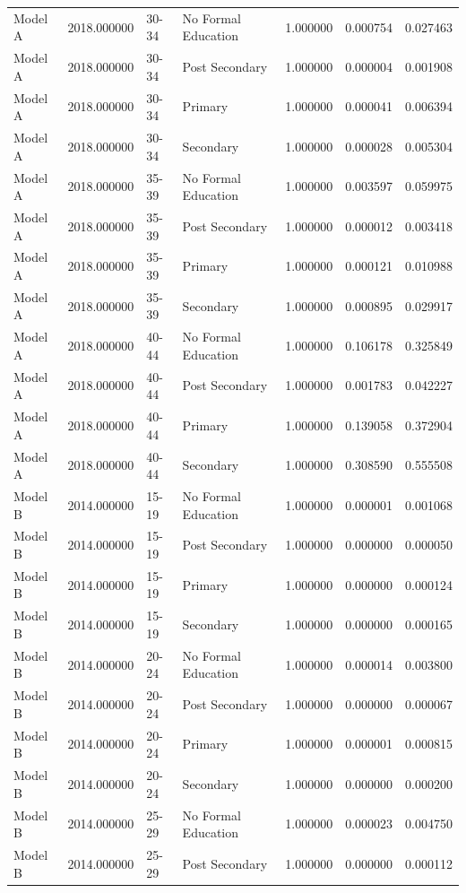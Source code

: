 \begin{table}[ht]
\begin{tabular}{lrllrrr}
Model A & 2018.000000 & 30-34 & No Formal Education & 1.000000 & 0.000754 & 0.027463 \\
Model A & 2018.000000 & 30-34 & Post Secondary & 1.000000 & 0.000004 & 0.001908 \\
Model A & 2018.000000 & 30-34 & Primary & 1.000000 & 0.000041 & 0.006394 \\
Model A & 2018.000000 & 30-34 & Secondary & 1.000000 & 0.000028 & 0.005304 \\
Model A & 2018.000000 & 35-39 & No Formal Education & 1.000000 & 0.003597 & 0.059975 \\
Model A & 2018.000000 & 35-39 & Post Secondary & 1.000000 & 0.000012 & 0.003418 \\
Model A & 2018.000000 & 35-39 & Primary & 1.000000 & 0.000121 & 0.010988 \\
Model A & 2018.000000 & 35-39 & Secondary & 1.000000 & 0.000895 & 0.029917 \\
Model A & 2018.000000 & 40-44 & No Formal Education & 1.000000 & 0.106178 & 0.325849 \\
Model A & 2018.000000 & 40-44 & Post Secondary & 1.000000 & 0.001783 & 0.042227 \\
Model A & 2018.000000 & 40-44 & Primary & 1.000000 & 0.139058 & 0.372904 \\
Model A & 2018.000000 & 40-44 & Secondary & 1.000000 & 0.308590 & 0.555508 \\
Model B & 2014.000000 & 15-19 & No Formal Education & 1.000000 & 0.000001 & 0.001068 \\
Model B & 2014.000000 & 15-19 & Post Secondary & 1.000000 & 0.000000 & 0.000050 \\
Model B & 2014.000000 & 15-19 & Primary & 1.000000 & 0.000000 & 0.000124 \\
Model B & 2014.000000 & 15-19 & Secondary & 1.000000 & 0.000000 & 0.000165 \\
Model B & 2014.000000 & 20-24 & No Formal Education & 1.000000 & 0.000014 & 0.003800 \\
Model B & 2014.000000 & 20-24 & Post Secondary & 1.000000 & 0.000000 & 0.000067 \\
Model B & 2014.000000 & 20-24 & Primary & 1.000000 & 0.000001 & 0.000815 \\
Model B & 2014.000000 & 20-24 & Secondary & 1.000000 & 0.000000 & 0.000200 \\
Model B & 2014.000000 & 25-29 & No Formal Education & 1.000000 & 0.000023 & 0.004750 \\
Model B & 2014.000000 & 25-29 & Post Secondary & 1.000000 & 0.000000 & 0.000112 \\

\end{tabular}
\end{table}
